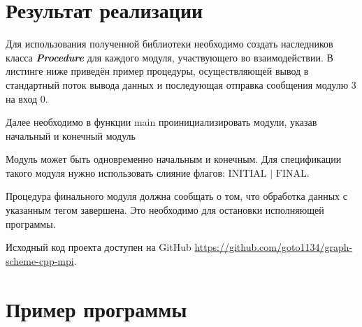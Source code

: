 \chapter{Результат реализации}
 Для использования полученной библиотеки необходимо создать наследников класса \textit{\textbf{Procedure}} для каждого модуля, участвующего во взаимодействии.  В листинге ниже приведён пример процедуры, осуществляющей вывод в стандартный поток вывода данных и последующая отправка сообщения модулю 3 на вход 0.
 
 
 
 Далее необходимо в функции main проинициализировать модули, указав начальный и конечный модуль

 
 
 Модуль может быть одновременно начальным и конечным. Для спецификации такого модуля нужно использовать слияние флагов: $ \text{INITIAL | FINAL} $.
 
 Процедура финального модуля должна сообщать о том, что обработка данных с указанным тегом завершена. Это необходимо для остановки исполняющей программы.
 
 
  
Исходный код проекта доступен на GitHub \href{https://github.com/goto1134/graph-scheme-cpp-mpi}{https://github.com/goto1134/graph-scheme-cpp-mpi}.

\chapter{Пример программы}



	